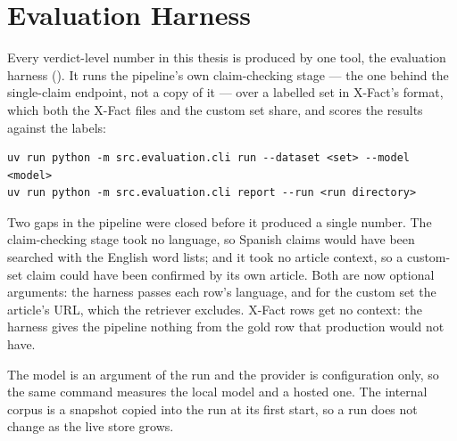 
\section{Evaluation Harness}
\label{sec:harness}

Every verdict-level number in this thesis is produced by one tool, the
evaluation harness (). It runs the
pipeline's own claim-checking stage --- the one behind the single-claim
endpoint, not a copy of it --- over a labelled set in X-Fact's format,
which both the X-Fact files and the custom set share, and scores the
results against the labels:

\begin{lstlisting}
uv run python -m src.evaluation.cli run --dataset <set> --model <model>
uv run python -m src.evaluation.cli report --run <run directory>
\end{lstlisting}

Two gaps in the pipeline were closed before it produced a single
number. The claim-checking stage took no language, so Spanish claims
would have been searched with the English word lists; and it took no
article context, so a custom-set claim could have been confirmed by
its own article. Both are now optional arguments: the harness passes
each row's language, and for the custom set the article's URL, which
the retriever excludes. X-Fact rows get no context: the harness gives
the pipeline nothing from the gold row that production would not have.

The model is an argument of the run and the provider is configuration
only, so the same command measures the local model and a hosted one.
The internal corpus is a snapshot copied into the run at its first
start, so a run does not change as the live store grows.

